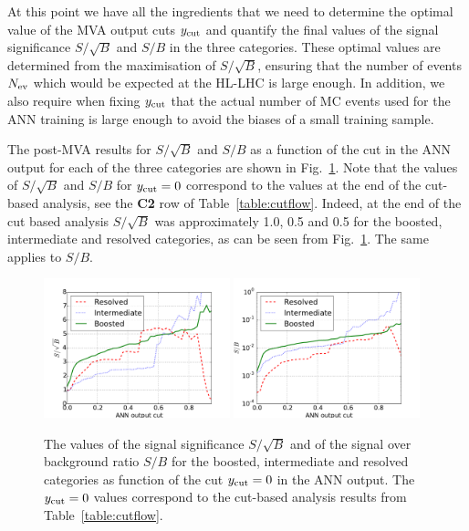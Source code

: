 At this point we have all the ingredients that we need to determine the optimal
value of the MVA output cuts $y_{\rm cut}$
and quantify the final values of the signal
significance $S/\sqrt{B}$ and $S/B$ in the three categories.
%
These optimal values are determined from the maximisation of $S/\sqrt{B}$,
ensuring that the number of events $N_{\rm ev}$
which would be expected at the HL-LHC is large
enough.
%
In addition, we also require when fixing $y_{\rm cut}$
that the actual number of MC events used for the ANN training
is large enough to avoid the biases of a small training sample.


The post-MVA results for $S/\sqrt{B}$ and $S/B$ as a function of the cut
in the ANN output for each of the three categories are shown in
Fig.~\ref{fig:sb_mva}.
%
Note that the values of $S/\sqrt{B}$ and $S/B$
for $y_{\rm cut}=0$ correspond to the values at
the end of the cut-based analysis, see
the {\bf C2} row of Table~\ref{table:cutflow}.
%
Indeed, at the end of the cut based analysis $S/\sqrt{B}$ was
approximately
1.0, 0.5 and 0.5 for the boosted, intermediate and resolved
categories, as can be seen from Fig.~\ref{fig:sb_mva}.
%
The same applies to $S/B$.

\begin{figure}[t]
\begin{center}
\includegraphics[width=0.48\textwidth]{plots/ssb_noPU.pdf}
\includegraphics[width=0.48\textwidth]{plots/sb_noPU.pdf}
\caption{\small
  The values of the signal significance $S/\sqrt{B}$ and of the
  signal over background ratio $S/B$ for the boosted, intermediate
  and resolved categories as  function of the cut
  $y_{\rm cut}=0$ in the ANN output.
  The $y_{\rm cut}=0$
  values correspond to the  cut-based analysis
  results from Table~\ref{table:cutflow}.
}
\label{fig:sb_mva}
\end{center}
\end{figure}

